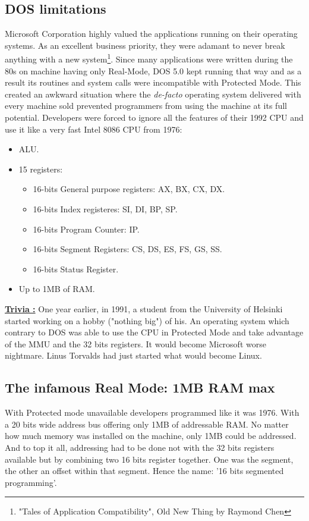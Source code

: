 \documentclass[book.tex]{subfiles}
\begin{document}
  \subsection{DOS limitations}
  Microsoft Corporation highly valued the applications running on their operating systems. As an excellent business priority, they were adamant to never break anything with a new system\footnote{"Tales of Application Compatibility", Old New Thing by Raymond Chen}.  Since many applications were written during the 80s on machine having only Real-Mode, DOS 5.0 kept running that way and as a result its routines and system calls were incompatible with Protected Mode. This created an awkward situation where the \emph{de-facto} operating system delivered with every machine sold prevented programmers from using the machine at its full potential. Developers were forced to ignore all the features of their 1992 CPU and use it like a very fast Intel 8086 CPU from 1976:\\
\begin{itemize}
\item ALU.
\item 15 registers:
\begin{itemize}
  \item 16-bits General purpose registers: AX, BX, CX, DX.
  \item 16-bits Index registeres: SI, DI, BP, SP.
  \item 16-bits Program Counter: IP.
  \item 16-bits Segment Registers: CS, DS, ES, FS, GS, SS.
  \item 16-bits Status Register.
\end{itemize}
\item Up to 1MB of RAM.
\end{itemize}


\bigskip

 \textbf{\underline{Trivia :}} One year earlier, in 1991, a student from the University of Helsinki started working on a hobby ("nothing big") of his. An operating system which contrary to DOS was able to use the CPU in Protected Mode and take advantage of the MMU and the 32 bits registers. It would become Microsoft worse nightmare. Linus Torvalds had just started what would become Linux.



  \subsection{The infamous Real Mode: 1MB RAM max}
  With Protected mode unavailable developers programmed like it was 1976. With a 20 bits wide address bus offering only 1MB of addressable RAM. No matter how much memory was installed on the machine, only 1MB could be addressed. And to top it all, addressing had to be done not with the 32 bits registers available but by combining two 16 bits register together. One was the segment, the other an offset within that segment. Hence the name: '16 bits segmented programming'.
\end{document}
